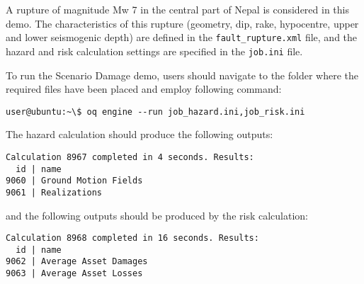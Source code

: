 A rupture of magnitude Mw 7 in the central part of Nepal is considered in this
demo. The characteristics of this rupture (geometry, dip, rake, hypocentre,
upper and lower seismogenic depth) are defined in the \verb+fault_rupture.xml+
file, and the hazard and risk calculation settings are specified in the
\verb+job.ini+ file.

To run the Scenario Damage demo, users should navigate to the folder where the
required files have been placed and employ following command:

\begin{verbatim}
user@ubuntu:~\$ oq engine --run job_hazard.ini,job_risk.ini
\end{verbatim}

The hazard calculation should produce the following outputs:

\begin{verbatim}
Calculation 8967 completed in 4 seconds. Results:
  id | name
9060 | Ground Motion Fields
9061 | Realizations
\end{verbatim}

and the following outputs should be produced by the risk calculation:

\begin{verbatim}
Calculation 8968 completed in 16 seconds. Results:
  id | name
9062 | Average Asset Damages
9063 | Average Asset Losses
\end{verbatim}
